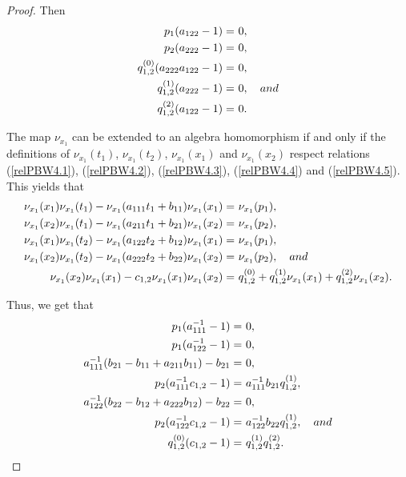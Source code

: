\documentclass{amsart}
\theoremstyle{definition}
\theoremstyle{remark}
\numberwithin{equation}{section}
\begin{document}
\begin{proof}
Then
\begin{align}
p_1(a_{122}-1) = &\ 0, \notag \\
p_2(a_{222}-1) = &\ 0, \notag \\
q_{1,2}^{(0)}(a_{222}a_{122}-1) = &\ 0, \label{secondsecondrel2} \\
q_{1,2}^{(1)}(a_{222}-1) = &\ 0, \quad {\rm and} \notag \\
q_{1,2}^{(2)}(a_{122}-1) = &\ 0. \notag 
\end{align}

The map $\nu_{x_1}$ can be extended to an algebra homomorphism if and only if the definitions of $\nu_{x_1}(t_1)$, $\nu_{x_1}(t_2)$,  $\nu_{x_1}(x_1)$ and $\nu_{x_1}(x_2)$ respect relations {\rm (}\ref{relPBW4.1}{\rm )}, {\rm (}\ref{relPBW4.2}{\rm )}, {\rm (}\ref{relPBW4.3}{\rm )}, {\rm (}\ref{relPBW4.4}{\rm )} and {\rm (}\ref{relPBW4.5}{\rm )}. This yields that 
\begin{align*}
   \nu_{x_1}(x_1)\nu_{x_1}(t_1)-\nu_{x_1}(a_{111}t_1+b_{11})\nu_{x_1}(x_1) = &\ \nu_{x_1}(p_1), \\
   \nu_{x_1}(x_2)\nu_{x_1}(t_1)-\nu_{x_1}(a_{211}t_1+b_{21})\nu_{x_1}(x_2) = &\ \nu_{x_1}(p_2), \\
   \nu_{x_1}(x_1)\nu_{x_1}(t_2)-\nu_{x_1}(a_{122}t_2+b_{12})\nu_{x_1}(x_1) = &\ \nu_{x_1}(p_1), \\
    \nu_{x_1}(x_2)\nu_{x_1}(t_2)-\nu_{x_1}(a_{222}t_2+b_{22})\nu_{x_1}(x_2) = &\ \nu_{x_1}(p_2), \quad {\rm and} \\
    \nu_{x_1}(x_2)\nu_{x_1}(x_1)-c_{1,2}\nu_{x_1}(x_1)\nu_{x_1}(x_2) = &\ q_{1,2}^{(0)}+q_{1,2}^{(1)}\nu_{x_1}(x_1)+q_{1,2}^{(2)}\nu_{x_1}(x_2).
\end{align*}

Thus, we get that 
\begin{align}
p_1(a_{111}^{-1}-1) = &\ 0, \notag \\
p_1(a_{122}^{-1}-1) = &\ 0, \notag \\
a_{111}^{-1}(b_{21}-b_{11}+a_{211}b_
{11})-b_{21} = &\ 0, \label{thirdsecondrel2} \\
p_2(a_{111}^{-1}c_{1,2}-1) = &\ a_{111}^{-1}b_{21}q_{1,2}^{(1)}, \notag \\
a_{122}^{-1}(b_{22}-b_{12}+a_{222}b_
{12})-b_{22} = &\ 0, \notag \\
p_2(a_{122}^{-1}c_{1,2}-1) = &\ a_{122}^{-1}b_{22}q_{1,2}^{(1)}, \quad {\rm and} \notag \\
q_{1,2}^{(0)}(c_{1,2}-1) = &\ q_{1,2}^{(1)}q_{1,2}^{(2)}. \notag 
\end{align}


\end{proof}
\end{document}
